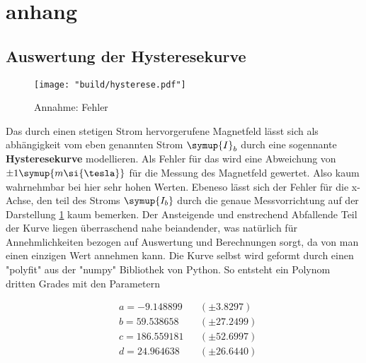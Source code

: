 \section{anhang}
\label{sec:anhang}





\subsection{Auswertung der Hysteresekurve}
\label{sec:auswertung_hyst}

\begin{figure}
    \centering
    \texttt{[image: "build/hysterese.pdf"]}
    \caption{Annahme: Fehler }
    \label{fig:Bfeld}
 \end{figure}

 
 Das durch einen stetigen Strom hervorgerufene Magnetfeld lässt sich als abhängigkeit vom eben genannten Strom $\symup{I}_b$ durch eine sogennante \textbf{Hysteresekurve} modellieren.
 Als Fehler für das wird eine Abweichung von $\pm 1 \symup{m\si{\tesla}}$ für die Messung des Magnetfeld gewertet. Also kaum wahrnehmbar bei hier sehr hohen Werten. Ebeneso lässt sich der Fehler für die x-Achse, den teil des Stroms 
 $\symup{I_b}$ durch die genaue Messvorrichtung auf der Darstellung \ref{fig:Bfeld} kaum bemerken.
 Der Ansteigende und enstrechend Abfallende Teil der Kurve liegen überraschend nahe beiandender, was natürlich für Annehmlichkeiten bezogen auf Auswertung und Berechnungen sorgt, da von man einen einzigen Wert annehmen kann.
 Die Kurve selbst wird geformt durch einen "polyfit" aus der "numpy" Bibliothek von Python. So entsteht ein Polynom dritten Grades mit den Parametern 

\begin{align*}
&a = -9.148899 &&(\pm 3.8297) \\
&b = 59.538658 &&(\pm 27.2499) \\
&c = 186.559181 &&(\pm 52.6997) \\
&d = 24.964638 &&(\pm 26.6440 )
\end{align*}








\newpage